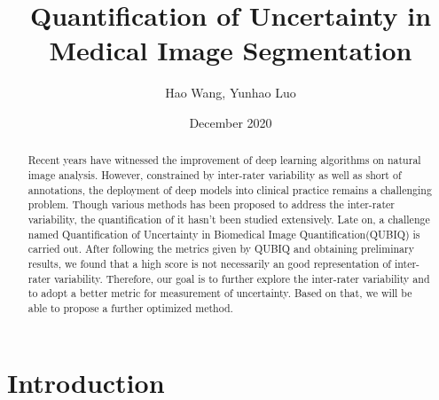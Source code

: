 \documentclass[12pt]{extarticle}
\title{Quantification of Uncertainty in Medical Image Segmentation}
\author{Hao Wang, Yunhao Luo}
\date{December 2020}
\begin{document}
\maketitle
\begin{abstract}
Recent years have witnessed the improvement of deep learning algorithms on natural image 
analysis. However, constrained by inter-rater variability as well as short of annotations, 
the deployment of deep models into clinical practice remains a challenging problem. Though various methods
has been proposed to address the inter-rater variability, the quantification of it hasn't been 
studied extensively. Late on, a challenge named Quantification of Uncertainty in Biomedical Image Quantification(QUBIQ)
is carried out. After following the metrics given by QUBIQ and obtaining preliminary results, we found that a high score 
is not necessarily an good representation of inter-rater variability. Therefore, our goal is to 
further explore the inter-rater variability and to adopt a better metric for measurement of uncertainty. 
Based on that, we will be able to propose a further optimized method. 
\end{abstract}
\section{Introduction}
\end{document}
